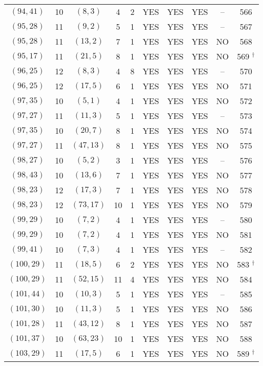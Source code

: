 \begin{longtable}{|c|c|c|c|c|c|c|c|c|c|}
$(94, 41)$ & 10 & $(8, 3)$ & 4 & 2 & YES & YES & YES & -- & 566\\
$(95, 28)$ & 11 & $(9, 2)$ & 5 & 1 & YES & YES & YES & -- & 567\\
$(95, 28)$ & 11 & $(13, 2)$ & 7 & 1 & YES & YES & YES & NO & 568\\
$(95, 17)$ & 11 & $(21, 5)$ & 8 & 1 & YES & YES & YES & NO & 569 ${}^\dagger$\\
$(96, 25)$ & 12 & $(8, 3)$ & 4 & 8 & YES & YES & YES & -- & 570\\
$(96, 25)$ & 12 & $(17, 5)$ & 6 & 1 & YES & YES & YES & NO & 571\\
$(97, 35)$ & 10 & $(5, 1)$ & 4 & 1 & YES & YES & YES & NO & 572\\
$(97, 27)$ & 11 & $(11, 3)$ & 5 & 1 & YES & YES & YES & -- & 573\\
$(97, 35)$ & 10 & $(20, 7)$ & 8 & 1 & YES & YES & YES & NO & 574\\
$(97, 27)$ & 11 & $(47, 13)$ & 8 & 1 & YES & YES & YES & NO & 575\\
$(98, 27)$ & 10 & $(5, 2)$ & 3 & 1 & YES & YES & YES & -- & 576\\
$(98, 43)$ & 10 & $(13, 6)$ & 7 & 1 & YES & YES & YES & NO & 577\\
$(98, 23)$ & 12 & $(17, 3)$ & 7 & 1 & YES & YES & YES & NO & 578\\
$(98, 23)$ & 12 & $(73, 17)$ & 10 & 1 & YES & YES & YES & NO & 579\\
$(99, 29)$ & 10 & $(7, 2)$ & 4 & 1 & YES & YES & YES & -- & 580\\
$(99, 29)$ & 10 & $(7, 2)$ & 4 & 1 & YES & YES & YES & NO & 581\\
$(99, 41)$ & 10 & $(7, 3)$ & 4 & 1 & YES & YES & YES & -- & 582\\
$(100, 29)$ & 11 & $(18, 5)$ & 6 & 2 & YES & YES & YES & NO & 583 ${}^\dagger$\\
$(100, 29)$ & 11 & $(52, 15)$ & 11 & 4 & YES & YES & YES & NO & 584\\
$(101, 44)$ & 10 & $(10, 3)$ & 5 & 1 & YES & YES & YES & -- & 585\\
$(101, 30)$ & 10 & $(11, 3)$ & 5 & 1 & YES & YES & YES & NO & 586\\
$(101, 28)$ & 11 & $(43, 12)$ & 8 & 1 & YES & YES & YES & NO & 587\\
$(101, 37)$ & 10 & $(63, 23)$ & 10 & 1 & YES & YES & YES & NO & 588\\
$(103, 29)$ & 11 & $(17, 5)$ & 6 & 1 & YES & YES & YES & NO & 589 ${}^\dagger$\\

\end{longtable}

